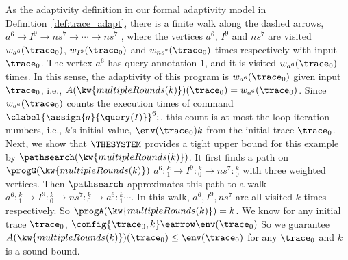 \begin{example}
As the adaptivity definition in our formal adaptivity model in Definition~\ref{def:trace_adapt},
there is a finite walk along the dashed arrows,
$a^{6} \to I^9 \to ns^{7} \to  \cdots \to ns^7$ , 
where the vertices $a^{6}$, $I^9$ and $ns^{7}$ are visited $w_{a^{6}}(\trace_0)$,
$w_{I^9}(\trace_0)$ and $w_{ns^{7}}(\trace_0)$
times respectively with input $\trace_0$.
The vertex $a^{6}$ has query annotation $1$, and it is visited $w_{a^{6}}(\trace_0)$ times.
In this sense, the adaptivity of this program is
$w_{a^{6}}(\trace_0)$ given input $\trace_0$, i.e., $A(\kw{multipleRounds(k)})(\trace_0) = w_{a^{6}}(\trace_0)$.
Since $w_{a^{6}}(\trace_0)$
counts the execution times of command $\clabel{\assign{a}{\query(I)}}^6;$,
this count is at most the loop iteration numbers, i.e., $k$'s initial value, $\env(\trace_0) k$ from the initial trace $\trace_0$.
{
Next, we show that {$\THESYSTEM$} provides a tight upper bound for this example by $\pathsearch(\kw{multipleRounds(k)})$.
It first finds a path on $\progG(\kw{multipleRounds(k)})$
$a^{6}: {}^k_1 \to I^9:{}^k_0 \to ns^7:{}^k_0$ with three weighted vertices. 
Then $\pathsearch$ approximates this path to a walk $a^{6}: {}^k_1 \to I^9:{}^k_0 \to ns^7:{}^k_0 \to a^{6}: {}^k_1 \cdots$.
In this walk, $a^6, I^9, ns^{7}$ are all visited $k$ times respectively. 
So $\progA(\kw{multipleRounds(k)}) = k$.
We know for any initial trace $\trace_0$, $\config{\trace_0, k} \earrow \env(\trace_0)$
So we guarantee $A(\kw{multipleRounds(k)})(\trace_0) \leq \env(\trace_0)$ for any $\trace_0$
and $k$ is a sound bound.
}
\end{example}
%
